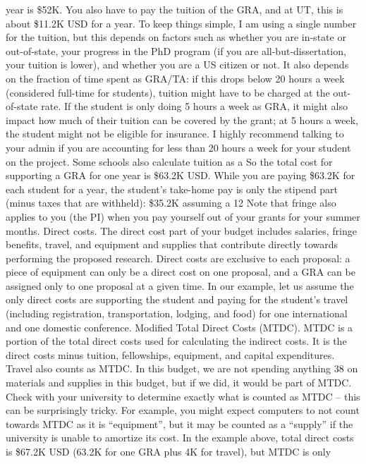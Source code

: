 \documentclass[oneside,11pt]{memoir}
\begin{document}
year is \$52K.
You also have to pay the tuition of the GRA, and at UT, this is about \$11.2K USD for a year. To
keep things simple, I am using a single number for the tuition, but this depends on factors such
as whether you are in-state or out-of-state, your progress in the PhD program (if you are
all-but-dissertation, your tuition is lower), and whether you are a US citizen or not. It also
depends on the fraction of time spent as GRA/TA: if this drops below 20 hours a week
(considered full-time for students), tuition might have to be charged at the out-of-state rate. If
the student is only doing 5 hours a week as GRA, it might also impact how much of their tuition
can be covered by the grant; at 5 hours a week, the student might not be eligible for insurance. I
highly recommend talking to your admin if you are accounting for less than 20 hours a week for
your student on the project. Some schools also calculate tuition as a %
So the total cost for supporting a GRA for one year is \$63.2K USD. While you are paying \$63.2K
for each student for a year, the student's take-home pay is only the stipend part (minus taxes
that are withheld): \$35.2K assuming a 12%
Note that fringe also applies to you (the PI) when you pay yourself out of your grants for your
summer months.
Direct costs. The direct cost part of your budget includes salaries, fringe benefits, travel, and
equipment and supplies that contribute directly towards performing the proposed research.
Direct costs are exclusive to each proposal: a piece of equipment can only be a direct cost on
one proposal, and a GRA can be assigned only to one proposal at a given time. In our example,
let us assume the only direct costs are supporting the student and paying for the student’s
travel (including registration, transportation, lodging, and food) for one international and one
domestic conference.
Modified Total Direct Costs (MTDC). MTDC is a portion of the total direct costs used for
calculating the indirect costs. It is the direct costs minus tuition, fellowships, equipment, and
capital expenditures. Travel also counts as MTDC. In this budget, we are not spending anything
38
on materials and supplies in this budget, but if we did, it would be part of MTDC. Check with
your university to determine exactly what is counted as MTDC – this can be surprisingly tricky.
For example, you might expect computers to not count towards MTDC as it is “equipment”, but it
may be counted as a “supply” if the university is unable to amortize its cost. In the example
above, total direct costs is \$67.2K USD (63.2K for one GRA plus 4K for travel), but MTDC is only
\end{document}
